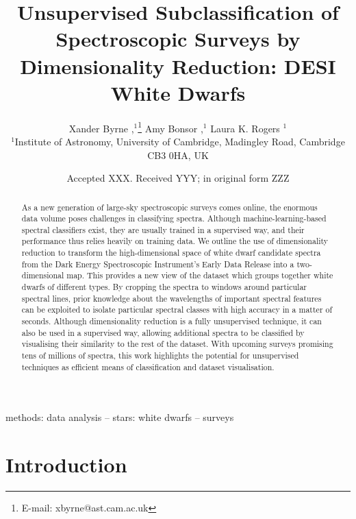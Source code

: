 \documentclass[fleqn,usenatbib]{mnras}
\title[
    Unsupervised Subclassification of Spectroscopic Surveys
]{
    Unsupervised Subclassification of Spectroscopic Surveys by Dimensionality Reduction: DESI White Dwarfs
}
\author[
    X. Byrne et al.
]{
    Xander Byrne
    \orcidlink{0000-0001-9488-238X},$^{1}$\thanks{E-mail: xbyrne@ast.cam.ac.uk}
    Amy Bonsor
    \orcidlink{0000-0002-8070-1901},$^{1}$
    Laura K. Rogers
    \orcidlink{0000-0002-3553-9474}$^{1}$
\\
$^{1}$Institute of Astronomy,
University of Cambridge,
Madingley Road,
Cambridge CB3 0HA,
UK
}
\date{Accepted XXX. Received YYY; in original form ZZZ}
\begin{document}
\label{firstpage}
\pagerange{\pageref{firstpage}--\pageref{lastpage}}
\maketitle

\begin{abstract}
As a new generation of large-sky spectroscopic surveys comes online, the enormous data volume poses challenges in classifying spectra.
Although machine-learning-based spectral classifiers exist, they are usually trained in a supervised way, and their performance thus relies heavily on training data.
We outline the use of dimensionality reduction to transform the high-dimensional space of white dwarf candidate spectra from the Dark Energy Spectroscopic Instrument's Early Data Release into a two-dimensional map.
This provides a new view of the dataset which groups together white dwarfs of different types.
By cropping the spectra to windows around particular spectral lines, prior knowledge about the wavelengths of important spectral features can be exploited to isolate particular spectral classes with high accuracy in a matter of seconds.
Although dimensionality reduction is a fully unsupervised technique, it can also be used in a supervised way, allowing additional spectra to be classified by visualising their similarity to the rest of the dataset.
With upcoming surveys promising tens of millions of spectra, this work highlights the potential for unsupervised techniques as efficient means of classification and dataset visualisation.
\end{abstract}

\begin{keywords}
methods: data analysis -- stars: white dwarfs -- surveys
\end{keywords}



\section{Introduction}
\end{document}
